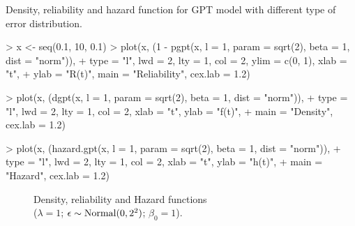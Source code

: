 \documentclass[nogin,letterpaper,12pt]{article}
\begin{document}
\begin{Example}
Density, reliability and hazard function for GPT model with different type of error distribution.
\begin{Schunk}
\begin{Sinput}
> x <- seq(0.1, 10, 0.1)
> plot(x, (1 - pgpt(x, l = 1, param = sqrt(2), beta = 1, dist = "norm")), 
+     type = "l", lwd = 2, lty = 1, col = 2, ylim = c(0, 1), xlab = "t", 
+     ylab = "R(t)", main = "Reliability", cex.lab = 1.2)
\end{Sinput}
\end{Schunk}
\begin{Schunk}
\begin{Sinput}
> plot(x, (dgpt(x, l = 1, param = sqrt(2), beta = 1, dist = "norm")), 
+     type = "l", lwd = 2, lty = 1, col = 2, xlab = "t", ylab = "f(t)", 
+     main = "Density", cex.lab = 1.2)
\end{Sinput}
\end{Schunk}
\begin{Schunk}
\begin{Sinput}
> plot(x, (hazard.gpt(x, l = 1, param = sqrt(2), beta = 1, dist = "norm")), 
+     type = "l", lwd = 2, lty = 1, col = 2, xlab = "t", ylab = "h(t)", 
+     main = "Hazard", cex.lab = 1.2)
\end{Sinput}
\end{Schunk}

\begin{figure}[ht!]
\centering
\captionsetup{justification=centering}
\caption{Density, reliability and Hazard functions \\ ($\lambda = 1$; $\epsilon \sim \textnormal{Normal}(0,2^2)$; $\beta_0 = 1$).}
\label{fignorm}
\end{figure}


\end{Example}
\end{document}

